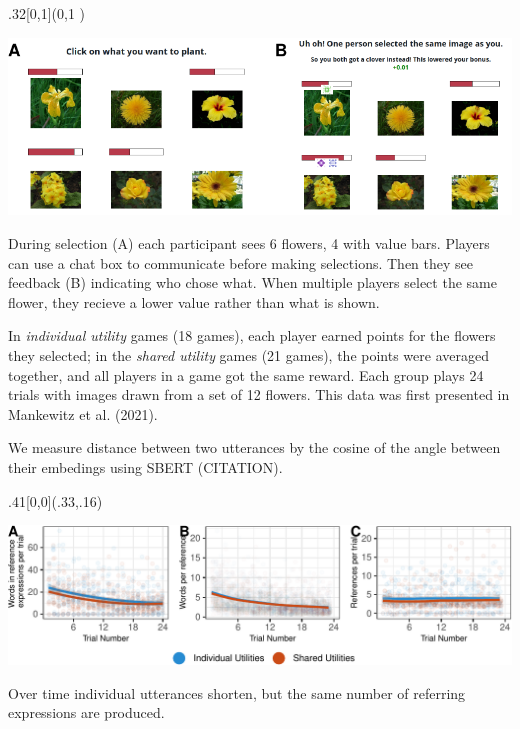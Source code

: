 \documentclass[10pt, xcolor=table, dvipsnames]{beamer}
\begin{document}
	\begin{textblock}{.32}[0,1](0,1 )
		\begin{tcolorbox}[title={\centering Experimental design }]

			
			\includegraphics[clip,width=\textwidth]{interface-1.pdf}
			
			\begin{small}
				 During selection (A) each participant sees 6 flowers, 4 with value bars. Players can use a chat box to communicate before making selections. Then they see feedback (B) indicating who chose what.  When multiple players select the same flower, they recieve a lower value rather than what is shown. 

				In \emph{individual utility} games (18 games), each player earned points for the
				flowers they selected; in the \emph{shared utility} games (21 games), the points
				were averaged together, and all players in a game got the same reward.
								Each group plays 24 trials with images drawn from a set of 12 flowers. This data was first presented in  Mankewitz et al. (2021).
								
								We measure distance between two utterances by the cosine of the angle between their embedings using SBERT (CITATION). 
								
								
			\end{small}
		
		\end{tcolorbox}
	\end{textblock}
	
	
	\begin{textblock}{.41}[0,0](.33,.16)
	\begin{tcolorbox}[title={\centering Referring expressions reduce over time}]  
		\includegraphics[width=.95\textwidth]{wordcount-1.pdf}    
		
	\begin{small}	Over time individual utterances shorten, but the same number of referring expressions are produced.     \end{small}                                              
	\end{tcolorbox}
\end{textblock}
\end{document}
